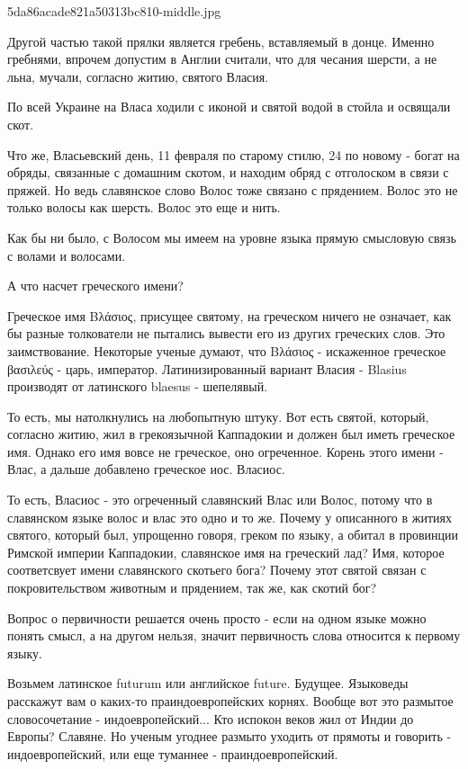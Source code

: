 \documentclass[a5paper,11pt,openany]{article}
\begin{document}
5da86acade821a50313bc810-middle.jpg

   Другой частью такой прялки является гребень, вставляемый в донце. Именно гребнями, впрочем допустим в Англии считали, что для чесания шерсти, а не льна, мучали, согласно житию, святого Власия.

   По всей Украине на Власа ходили с иконой и святой водой в стойла и освящали скот.

   Что же, Власьевский день, 11 февраля по старому стилю, 24 по новому - богат на обряды, связанные с домашним скотом, и находим обряд с отголоском в связи с пряжей. Но ведь славянское слово Волос тоже связано с прядением. Волос это не только волосы как шерсть. Волос это еще и нить.

   Как бы ни было, с Волосом мы имеем на уровне языка прямую смысловую связь с волами и волосами.

   А что насчет греческого имени?

   Греческое имя Βλάσιος, присущее святому, на греческом ничего не означает, как бы разные толкователи не пытались вывести его из других греческих слов. Это заимствование. Некоторые ученые думают, что Βλάσιος - искаженное греческое βασιλεύς - царь, император. Латинизированный вариант Власия -  Blasius производят от латинского blaesus - шепелявый. 

   То есть, мы натолкнулись на любопытную штуку. Вот есть святой, который, согласно житию, жил в грекоязычной Каппадокии и должен был иметь греческое имя. Однако его имя вовсе не греческое, оно огреченное. Корень этого имени - Влас, а дальше добавлено греческое иос. Власиос.

   То есть, Власиос - это огреченный славянский Влас или Волос, потому что в славянском языке волос и влас это одно и то же. Почему у описанного в житиях святого, который был, упрощенно говоря, греком по языку, а обитал в провинции Римской империи Каппадокии, славянское имя на греческий лад? Имя, которое соответсвует имени славянского скотьего бога? Почему этот святой связан с покровительством животным и прядением, так же, как скотий бог?

   Вопрос о первичности решается очень просто - если на одном языке можно понять смысл, а на другом нельзя, значит первичность слова относится к первому языку.

   Возьмем латинское futurum или английское future. Будущее. Языковеды расскажут вам о каких-то праиндоевропейских корнях. Вообще вот это размытое словосочетание - индоевропейский... Кто испокон веков жил от Индии до Европы? Славяне. Но ученым угоднее  размыто уходить от прямоты и говорить - индоевропейский, или еще туманнее - праиндоевропейский.
\end{document}
